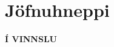 \documentclass[A4paper,10pt,icelandic]{sphinxmanual}
\begin{document}
 \chapter{Jöfnuhneppi}
 \textbf{Í VINNSLU}
% 
% 
% 
% 
% 
% 
% 
\end{document}
